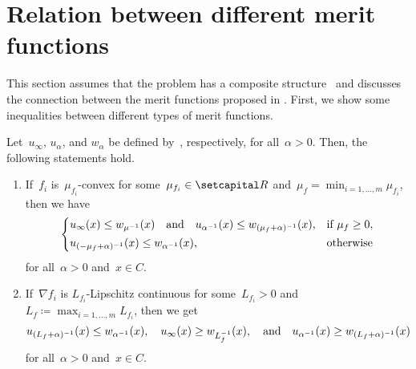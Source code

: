 \documentclass[../main]{subfiles}
\begin{document}
\section{Relation between different merit functions} 
This section assumes that the problem has a composite structure~ and discusses the connection between the merit functions proposed in .
First, we show some inequalities between different types of merit functions.
\begin{theorem} 
    Let~$u_\infty$, $u_\alpha$, and $w_\alpha$ be defined by~, respectively, for all~$\alpha > 0$.
    Then, the following statements hold.
    \begin{enumerate}
        \item If~$f_i$ is~$\mu_{f_i}$-convex for some~$\mu_{f_i} \in \setR$ and~$\mu_f = \min_{i = 1, \dots, m} \mu_{f_i}$, then we have
            \begin{equation}
                \begin{dcases}
                    u_\infty(x) \le w_{\mu^{-1}}(x) \quad \text{and} \quad u_{\alpha^{-1}}(x) \le w_{(\mu_f + \alpha)^{-1}}(x), & \text{if } \mu_f \ge 0, \\
                    u_{(- \mu_f + \alpha)^{-1}}(x) \le w_{\alpha^{-1}}(x), & \text{otherwise}
                \end{dcases}
            \end{equation}
            for all~$\alpha > 0$ and~$x \in C$. 

        \item If~$\nabla f_i$ is $L_{f_i}$-Lipschitz continuous for some~$L_{f_i} > 0$ and~$L_f \coloneqq \max_{i = 1, \dots, m} L_{f_i}$, then we get
            \begin{equation}
                u_{(L_f + \alpha)^{-1}}(x) \le w_{\alpha^{-1}}(x), \quad u_\infty(x) \ge w_{L_f^{-1}}(x), \quad \text{and} \quad u_{\alpha^{-1}}(x) \ge w_{(L_f + \alpha)^{-1}}(x)
            \end{equation}
            for all~$\alpha > 0$ and~$x \in C$.
    \end{enumerate}
\end{theorem}
\end{document}
